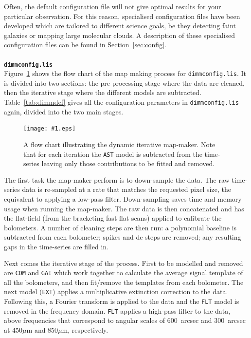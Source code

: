 \documentclass[twoside,11pt]{article}
\newcommand{\htmladdimg}[1]{}
\newcommand{\htmlref}[2]{#1}
\newcommand{\latexhtml}[2]{#1}
\renewcommand{\_}{\texttt{\symbol{95}}}
\newcommand{\myfig}[5]{
  \begin{figure}#2
    \centering\texttt{[image: \#1.eps]}
    \typeout{#1.eps inserted on page \arabic{page}}
    \caption{\label{#4}\small #5}
  \end{figure}
}
\newcommand{\myfig}[5]{
    \label{#4} \htmladdimg{#1.png}\\
    \\
    Figure: #5\\
  }
\newcommand{\cref}[3]{\latexhtml{#1~\ref{#2}}{\htmlref{#3}{#2}}}
\begin{document}
Often, the default configuration file will not give optimal results
for your particular observation. For this reason, specialised
configuration files have been developed which are tailored to
different science goals, be they detecting faint galaxies or mapping
large molecular clouds. A
description of these specialised configuration files can be found
\cref{in Section}{sec:config}{here}.
\\ \\
{\large{\texttt{\bf dimmconfig.lis}}}\\
\cref{Figure}{fig:dimm}{The graphic below} shows the flow chart
of the map making process
for \texttt{dimmconfig.lis}. It is divided into two sections: the
pre-processing stage where the data are cleaned, then the iterative
stage where the different models are subtracted.
\cref{Table}{tab:dimmdef}{A table of active variables} gives all the
configuration parameters in \texttt{dimmconfig.lis} again, divided
into the two main stages.

\myfig{sc21_flow_dimm_blue}{}{width=0.78\linewidth}{fig:dimm}{
  A flow chart illustrating the dynamic iterative map-maker. Note that
  for each iteration the \texttt{AST} model is subtracted from the
  time-series leaving only those contributions to be fitted and
  removed.}

The first task the map-maker perform is to down-sample the data. The
raw time-series data is re-sampled at a rate that matches the
requested pixel size, the equivalent to applying a low-pass filter.
Down-sampling saves time and memory usage when running the map-maker.
The raw data is then concatenated and has the flat-field (from the
bracketing fast flat scans) applied to calibrate the bolometers. A
number of cleaning steps are then run: a polynomial baseline is
subtracted from each bolometer; spikes and dc steps are removed; any
resulting gaps in the time-series are filled in.

Next comes the iterative stage of the process. First to be modelled
and removed are \texttt{COM} and \texttt{GAI} which work together to
calculate the average signal template of all the bolometers, and then
fit/remove the templates from each bolometer. The next model
(\texttt{EXT}) applies a multiplicative extinction correction to the
data.  Following this, a Fourier transform is applied to the data and
the \texttt{FLT} model is removed in the frequency domain.
\texttt{FLT} applies a high-pass filter to the data, above frequencies
that correspond to angular scales of 600~arcsec and 300~arcsec at
450$\mu$m and 850$\mu$m, respectively.
\end{document}
